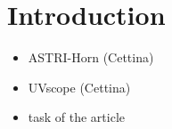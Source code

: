 \section{Introduction}
\label{sect:intro}

\begin{itemize}
\item
ASTRI-Horn (Cettina)
\item
UVscope (Cettina)
\item
task of the article 
\end{itemize}